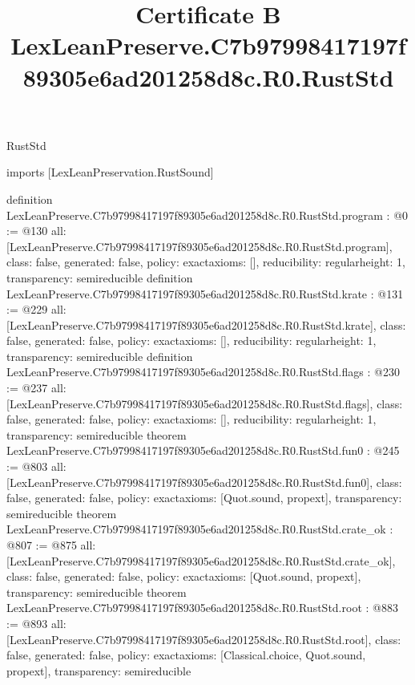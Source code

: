\begin{lexlean}{RustStd}
\title{Certificate B LexLeanPreserve.C7b97998417197f89305e6ad201258d8c.R0.RustStd}
\begin{coremodule}
imports [LexLeanPreservation.RustSound]

definition LexLeanPreserve.C7b97998417197f89305e6ad201258d8c.R0.RustStd.program : @0 := @130 {
  all: [LexLeanPreserve.C7b97998417197f89305e6ad201258d8c.R0.RustStd.program],
  class: false,
  generated: false,
  policy: exact{axioms: []},
  reducibility: regular{height: 1},
  transparency: semireducible
}
definition LexLeanPreserve.C7b97998417197f89305e6ad201258d8c.R0.RustStd.krate : @131 := @229 {
  all: [LexLeanPreserve.C7b97998417197f89305e6ad201258d8c.R0.RustStd.krate],
  class: false,
  generated: false,
  policy: exact{axioms: []},
  reducibility: regular{height: 1},
  transparency: semireducible
}
definition LexLeanPreserve.C7b97998417197f89305e6ad201258d8c.R0.RustStd.flags : @230 := @237 {
  all: [LexLeanPreserve.C7b97998417197f89305e6ad201258d8c.R0.RustStd.flags],
  class: false,
  generated: false,
  policy: exact{axioms: []},
  reducibility: regular{height: 1},
  transparency: semireducible
}
theorem LexLeanPreserve.C7b97998417197f89305e6ad201258d8c.R0.RustStd.fun0 : @245 := @803 {
  all: [LexLeanPreserve.C7b97998417197f89305e6ad201258d8c.R0.RustStd.fun0],
  class: false,
  generated: false,
  policy: exact{axioms: [Quot.sound, propext]},
  transparency: semireducible
}
theorem LexLeanPreserve.C7b97998417197f89305e6ad201258d8c.R0.RustStd.crate_ok : @807 := @875 {
  all: [LexLeanPreserve.C7b97998417197f89305e6ad201258d8c.R0.RustStd.crate_ok],
  class: false,
  generated: false,
  policy: exact{axioms: [Quot.sound, propext]},
  transparency: semireducible
}
theorem LexLeanPreserve.C7b97998417197f89305e6ad201258d8c.R0.RustStd.root : @883 := @893 {
  all: [LexLeanPreserve.C7b97998417197f89305e6ad201258d8c.R0.RustStd.root],
  class: false,
  generated: false,
  policy: exact{axioms: [Classical.choice, Quot.sound, propext]},
  transparency: semireducible
}


\end{coremodule}
\end{lexlean}
